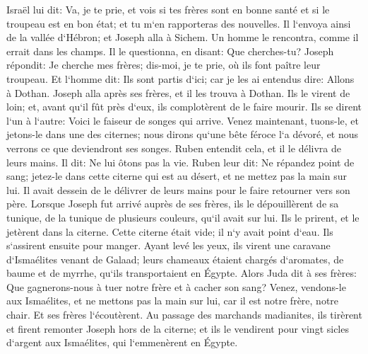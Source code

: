 \verse Israël lui dit: Va, je te prie, et vois si tes frères sont en bonne santé et si le troupeau est en bon état; et tu m`en rapporteras des nouvelles. Il l`envoya ainsi de la vallée d`Hébron; et Joseph alla à Sichem. 
\verse Un homme le rencontra, comme il errait dans les champs. Il le questionna, en disant: Que cherches-tu? 
\verse Joseph répondit: Je cherche mes frères; dis-moi, je te prie, où ils font paître leur troupeau. 
\verse Et l`homme dit: Ils sont partis d`ici; car je les ai entendus dire: Allons à Dothan. Joseph alla après ses frères, et il les trouva à Dothan. 
\verse Ils le virent de loin; et, avant qu`il fût près d`eux, ils complotèrent de le faire mourir. 
\verse Ils se dirent l`un à l`autre: Voici le faiseur de songes qui arrive. 
\verse Venez maintenant, tuons-le, et jetons-le dans une des citernes; nous dirons qu`une bête féroce l`a dévoré, et nous verrons ce que deviendront ses songes. 
\verse Ruben entendit cela, et il le délivra de leurs mains. Il dit: Ne lui ôtons pas la vie. 
\verse Ruben leur dit: Ne répandez point de sang; jetez-le dans cette citerne qui est au désert, et ne mettez pas la main sur lui. Il avait dessein de le délivrer de leurs mains pour le faire retourner vers son père. 
\verse Lorsque Joseph fut arrivé auprès de ses frères, ils le dépouillèrent de sa tunique, de la tunique de plusieurs couleurs, qu`il avait sur lui. 
\verse Ils le prirent, et le jetèrent dans la citerne. Cette citerne était vide; il n`y avait point d`eau. 
\verse Ils s`assirent ensuite pour manger. Ayant levé les yeux, ils virent une caravane d`Ismaélites venant de Galaad; leurs chameaux étaient chargés d`aromates, de baume et de myrrhe, qu`ils transportaient en Égypte. 
\verse Alors Juda dit à ses frères: Que gagnerons-nous à tuer notre frère et à cacher son sang? 
\verse Venez, vendons-le aux Ismaélites, et ne mettons pas la main sur lui, car il est notre frère, notre chair. Et ses frères l`écoutèrent. 
\verse Au passage des marchands madianites, ils tirèrent et firent remonter Joseph hors de la citerne; et ils le vendirent pour vingt sicles d`argent aux Ismaélites, qui l`emmenèrent en Égypte. 
